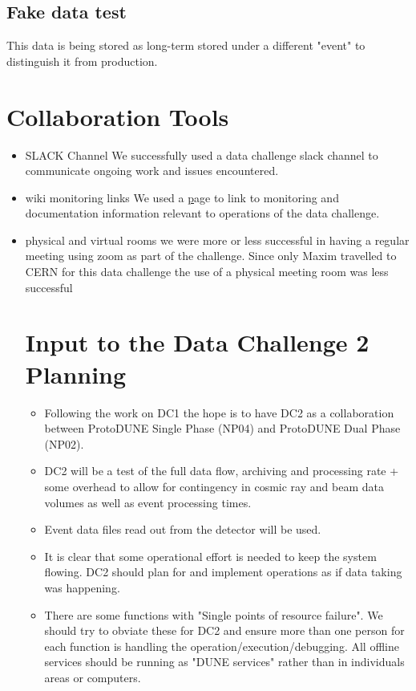 \documentclass[pdftex,12pt,letter]{article}
\begin{document}
\subsection {Fake data test}
 This data is being stored as long-term stored under a different "event" to distinguish it from production.

\section {Collaboration Tools}
\begin {itemize}
\item SLACK Channel
We successfully used a data challenge slack channel to communicate ongoing work and issues encountered. 
\item  wiki monitoring links
We used a
\href {wiki.dunescience.org} page to link to monitoring and documentation information relevant to operations of the data challenge. 
\item physical and virtual rooms 
we were more or less successful in having  a regular meeting using zoom as part of the challenge. Since only Maxim travelled to CERN for this data challenge the use of a physical meeting room was less successful

\section {Input to the Data Challenge 2 Planning}

\begin{itemize}
\item Following the work on DC1 the hope is to have DC2 as a collaboration between ProtoDUNE Single Phase (NP04) and ProtoDUNE Dual Phase (NP02). 

\item DC2 will be a test of the full data flow, archiving and processing rate + some overhead to allow for contingency in cosmic ray and beam data volumes as well as event processing times. 

\item Event data files read out from the detector will be used.

\item It is clear that some operational effort is needed to keep the system flowing. DC2 should plan for and implement operations as if data taking was happening. 

\item There are some functions with "Single points of resource failure". We should try to obviate these for DC2 and ensure more than one person for each function is handling the operation/execution/debugging. All offline services should be running as "DUNE services" rather than in individuals areas or computers. 


\end{itemize}



\end{itemize}



\clearpage
\end{document}
